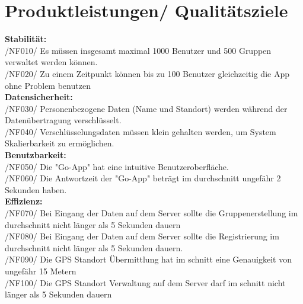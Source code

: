 \section{Produktleistungen/ Qualitätsziele}
\textbf{Stabilität:}\\
/NF010/	Es müssen insgesamt maximal 1000 Benutzer und 500 Gruppen verwaltet werden können. \\
/NF020/	Zu einem Zeitpunkt können bis zu 100 Benutzer gleichzeitig die App ohne Problem benutzen \\
\textbf{Datensicherheit:}\\
/NF030/	Personenbezogene Daten (Name und Standort) werden während der Datenübertragung verschlüsselt.\\
/NF040/	Verschlüsselungsdaten müssen klein gehalten werden, um System Skalierbarkeit zu ermöglichen.\\
\textbf{Benutzbarkeit:}\\
/NF050/	Die "Go-App" hat eine intuitive Benutzeroberfläche.\\
/NF060/	Die Antwortzeit der "Go-App" beträgt im durchschnitt ungefähr 2 Sekunden haben.\\

\textbf{Effizienz:}\\
/NF070/	Bei Eingang der Daten auf dem Server sollte die Gruppenerstellung im durchschnitt nicht länger als 5 Sekunden dauern\\
/NF080/	Bei Eingang der Daten auf dem Server sollte die Registrierung im durchschnitt nicht länger als 5 Sekunden dauern.\\
/NF090/	Die GPS Standort Übermittlung hat im schnitt eine Genauigkeit von ungefähr 15 Metern \\
/NF100/	Die GPS Standort Verwaltung auf dem Server darf im schnitt nicht länger als 5 Sekunden dauern  \\



